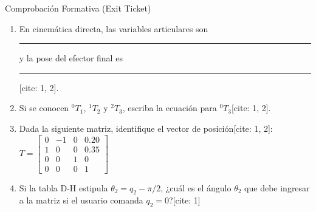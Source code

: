 \documentclass[aspectratio=169, table, xcdraw]{beamer}
\begin{document}
\begin{frame}{Comprobación Formativa (Exit Ticket)}
    \begin{tcolorbox}[colback=white, colframe=ucbblue, title=Consolidación Rápida]
        \begin{enumerate}
            \item En cinemática directa, las variables articulares son \rule{2cm}{0.15mm} y la pose del efector final es \rule{2cm}{0.15mm}[cite: 1, 2].
            \item Si se conocen ${}^{0}T_1$, ${}^{1}T_2$ y ${}^{2}T_3$, escriba la ecuación para ${}^{0}T_3$[cite: 1, 2].
            \item Dada la siguiente matriz, identifique el vector de posición[cite: 1, 2]:
            $T = \begin{bmatrix} 0&-1&0&0.20 \\ 1&0&0&0.35 \\ 0&0&1&0 \\ 0&0&0&1 \end{bmatrix}$
            \item Si la tabla D-H estipula $\theta_2 = q_2 - \pi/2$, ¿cuál es el ángulo $\theta_2$ que debe ingresar a la matriz si el usuario comanda $q_2 = 0$?[cite: 1]
        \end{enumerate}
    \end{tcolorbox}
\end{frame}
\end{document}
